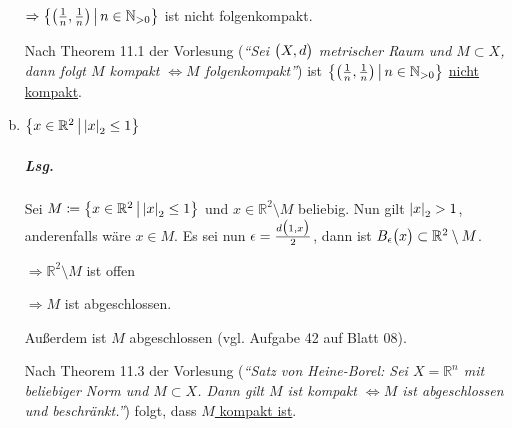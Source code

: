 \documentclass{scrreprt}
\begin{document}
\begin{enumerate}[(a)]
  $\Rightarrow
  \qty{\qty(\frac{1}{n}, \frac{1}{n}) \,\middle |\, n \in \mathbb{N}_{> 0}}$
  ist nicht folgenkompakt.

  Nach Theorem 11.1 der Vorlesung (\emph{``Sei $\qty\big(X, d)$ metrischer Raum
    und $M \subset X$, dann folgt $M$ kompakt $\iff M$ folgenkompakt''})
  ist $\qty{\qty(\frac{1}{n}, \frac{1}{n}) \,\middle |\, n \in \mathbb{N}_{> 0}}$
  \underline{nicht kompakt}.

\item $\qty\big{x \in \mathbb{R}^2 \,{\big |}\, \abs{x}_2 \leq 1}$

  \subparagraph{Lsg.} Sei $M \coloneqq
  \qty\big{x \in \mathbb{R}^2 \,{\big |}\, \abs{x}_2 \leq 1}$ und
  $x \in \mathbb{R}^2 \setminus M$ beliebig.
  Nun gilt $\abs{x}_2 > 1$, anderenfalls wäre $x \in M$.
  Es sei nun $\epsilon = \frac{d\qty\big(1, x)}{2}$, dann ist
  $B_{\epsilon}\qty\big(x) \subset \mathbb{R}^2 \setminus M$.

  $\Rightarrow \mathbb{R}^2 \setminus M$ ist offen

  $\Rightarrow M$ ist abgeschlossen.

  Außerdem ist $M$ abgeschlossen (vgl. Aufgabe 42 auf Blatt 08).

  Nach Theorem 11.3 der Vorlesung (\emph{``Satz von Heine-Borel: Sei
    $X = \mathbb{R}^n$ mit beliebiger Norm und $M \subset X$.
    Dann gilt $M$ ist kompakt $\iff M$ ist abgeschlossen und beschränkt.''})
  folgt, dass \underline{$M$ kompakt ist}.
\end{enumerate}

\newpage
\end{document}
